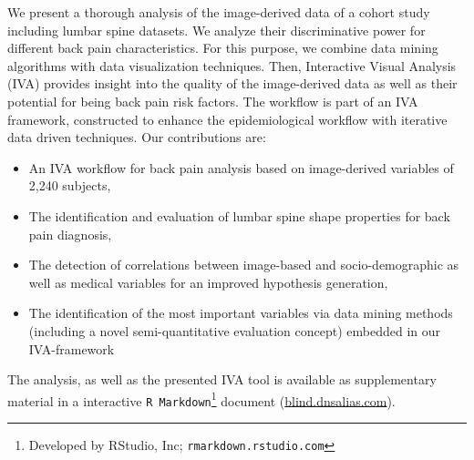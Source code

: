 \documentclass[a4paper,twoside]{style/article}
\begin{document}
We present a thorough analysis of the image-derived data of a cohort study including lumbar spine datasets.
We analyze their discriminative power for different back pain characteristics.
For this purpose, we combine data mining algorithms with data visualization techniques.
Then, Interactive Visual Analysis (IVA) provides insight into the quality of the image-derived data as well as their potential for being back pain risk factors.
The workflow is part of an IVA framework, constructed to enhance the epidemiological workflow with iterative data driven techniques.
Our contributions are:
\begin{itemize}
\item An IVA workflow for back pain analysis based on image-derived variables of 2,240 subjects,
\item The identification and evaluation of lumbar spine shape properties for back pain diagnosis,
\item The detection of correlations between image-based and socio-demographic as well as medical variables for an improved hypothesis generation,
\item The identification of the most important variables via data mining methods (including a novel semi-quantitative evaluation concept) embedded in our IVA-framework
\end{itemize}
The analysis, as well as the presented IVA tool is available as supplementary material in a interactive \texttt{R Markdown}\footnote{Developed by RStudio, Inc; \texttt{rmarkdown.rstudio.com}} document (\url{blind.dnsalias.com}).
\end{document}
